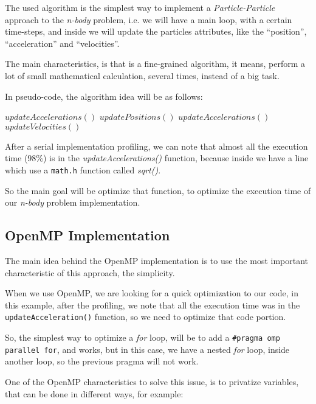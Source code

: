 
The used algorithm is the simplest
way to implement a \emph{Particle-Particle}
approach to the \emph{n-body} problem,
i.e. we will have a main loop, with a certain
time-steps, and inside we will update the
particles attributes, like the ``position'',
``acceleration'' and ``velocities''.

The main characteristics,
is that is a fine-grained algorithm,
it means, perform a lot of small
mathematical calculation, several times,
instead of a big task.

In pseudo-code, the algorithm idea will be
as follows:

\begin{center}
\begin{algorithmic}
\STATE $updateAccelerations()$
    \STATE $updatePositions()$
    \STATE $updateAccelerations()$
    \STATE $updateVelocities()$
\ENDFOR 
\end{algorithmic}
\end{center}

After a serial implementation profiling,
we can note that almost all the execution time ($98\%$)
is in the \emph{updateAccelerations()} function,
because inside we have a line which use a \texttt{math.h}
function called \emph{sqrt()}.

So the main goal will be optimize that function,
to optimize the execution time of our \emph{n-body} problem
implementation.

\subsection{OpenMP Implementation}
 
The main idea behind the OpenMP implementation
is to use the most important characteristic of this approach,
the simplicity.

When we use OpenMP, we are looking for a quick
optimization to our code, in this example,
after the profiling, we note that all the execution
time was in the \texttt{updateAcceleration()} function,
so we need to optimize that code portion.

So, the simplest way to optimize a \emph{for} loop,
will be to add a \texttt{\#pragma omp parallel for},
and works, but in this case, we have a nested \emph{for} loop,
inside another loop, so the previous pragma will not work.

One of the OpenMP characteristics to solve this issue,
is to privatize variables, that can be done in different ways,
for example:

